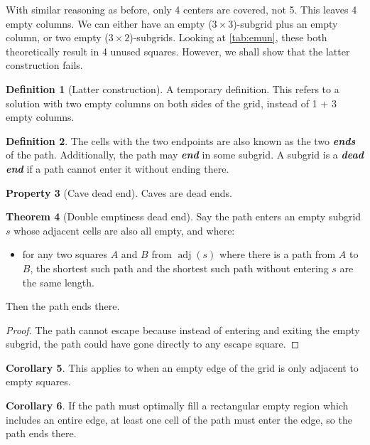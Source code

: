 \documentclass{article}
\theoremstyle{definition}%
\newtheorem{theorem}{Theorem}[section]
\newtheorem{corollary}[theorem]{Corollary}%
\newtheorem{definition}[theorem]{Definition}
\newtheorem{property}[theorem]{Property}
\newcommand{\newterm}[1]{\textbf{\textit{#1}}}
\newcommand{\adj}{\operatorname{adj}}
\begin{document}
With similar reasoning as before, only 4 centers are covered, not 5. This leaves 4 empty columns. We can either have an empty ($3 \times 3$)-subgrid plus an empty column, or two empty ($3 \times 2$)-subgrids. Looking at \cref{tab:emun}, these both theoretically result in 4 unused squares. However, we shall show that the latter construction fails.

\begin{definition}[Latter construction]\label{def:3814lc}
A temporary definition. This refers to a solution with two empty columns on both sides of the grid, instead of 1 + 3 empty columns.
\end{definition}

\begin{definition}
The cells with the two endpoints are also known as the two \newterm{ends} of the path.
Additionally, the path may \newterm{end} in some subgrid. A subgrid is a \newterm{dead end} if a path cannot enter it without ending there.
\end{definition}

\begin{property}[Cave dead end] \label{prop:cavedend}
Caves are dead ends.
\end{property}

\begin{theorem}[Double emptiness dead end] \label{th:2xndend}
Say the path enters an empty subgrid $s$ whose adjacent cells are also all empty, and where:
\begin{itemize}
\item for any two squares $A$ and $B$ from $\adj(s)$ where there is a path from $A$ to $B$, the shortest such path and the shortest such path without entering $s$ are the same length.
\end{itemize}

Then the path ends there.
\end{theorem}
\begin{proof}
The path cannot escape because instead of entering and exiting the empty subgrid, the path could have gone directly to any escape square.
\end{proof}

\begin{corollary}
This applies to when an empty edge of the grid is only adjacent to empty squares.
\end{corollary}

\begin{corollary}
If the path must optimally fill a rectangular empty region which includes an entire edge,
at least one cell of the path must enter the edge, so the path ends there.
\end{corollary}
\end{document}
